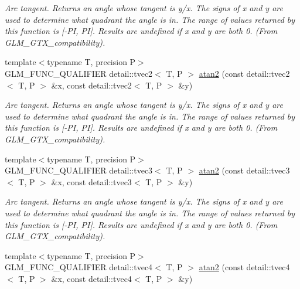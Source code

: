 \begin{CompactItemize}
\begin{CompactList}\small\item\em Arc tangent. Returns an angle whose tangent is y/x. The signs of x and y are used to determine what quadrant the angle is in. The range of values returned by this function is \mbox{[}-PI, PI\mbox{]}. Results are undefined if x and y are both 0. (From GLM\_\-GTX\_\-compatibility). \item\end{CompactList}\item 
\hypertarget{group__gtx__compatibility_g8dc4b8f0530c01b053743c0735e286ba}{
{\footnotesize template$<$typename T, precision P$>$ }\\GLM\_\-FUNC\_\-QUALIFIER detail::tvec2$<$ T, P $>$ \hyperlink{group__gtx__compatibility_g8dc4b8f0530c01b053743c0735e286ba}{atan2} (const detail::tvec2$<$ T, P $>$ \&x, const detail::tvec2$<$ T, P $>$ \&y)}
\label{group__gtx__compatibility_g8dc4b8f0530c01b053743c0735e286ba}

\begin{CompactList}\small\item\em Arc tangent. Returns an angle whose tangent is y/x. The signs of x and y are used to determine what quadrant the angle is in. The range of values returned by this function is \mbox{[}-PI, PI\mbox{]}. Results are undefined if x and y are both 0. (From GLM\_\-GTX\_\-compatibility). \item\end{CompactList}\item 
\hypertarget{group__gtx__compatibility_gbff44d2ce3461c971abd56efd0dc3abb}{
{\footnotesize template$<$typename T, precision P$>$ }\\GLM\_\-FUNC\_\-QUALIFIER detail::tvec3$<$ T, P $>$ \hyperlink{group__gtx__compatibility_gbff44d2ce3461c971abd56efd0dc3abb}{atan2} (const detail::tvec3$<$ T, P $>$ \&x, const detail::tvec3$<$ T, P $>$ \&y)}
\label{group__gtx__compatibility_gbff44d2ce3461c971abd56efd0dc3abb}

\begin{CompactList}\small\item\em Arc tangent. Returns an angle whose tangent is y/x. The signs of x and y are used to determine what quadrant the angle is in. The range of values returned by this function is \mbox{[}-PI, PI\mbox{]}. Results are undefined if x and y are both 0. (From GLM\_\-GTX\_\-compatibility). \item\end{CompactList}\item 
\hypertarget{group__gtx__compatibility_ga7c3a1b05bab87aa5a7cbc9efadfbc52}{
{\footnotesize template$<$typename T, precision P$>$ }\\GLM\_\-FUNC\_\-QUALIFIER detail::tvec4$<$ T, P $>$ \hyperlink{group__gtx__compatibility_ga7c3a1b05bab87aa5a7cbc9efadfbc52}{atan2} (const detail::tvec4$<$ T, P $>$ \&x, const detail::tvec4$<$ T, P $>$ \&y)}
\label{group__gtx__compatibility_ga7c3a1b05bab87aa5a7cbc9efadfbc52}


\end{CompactItemize}
